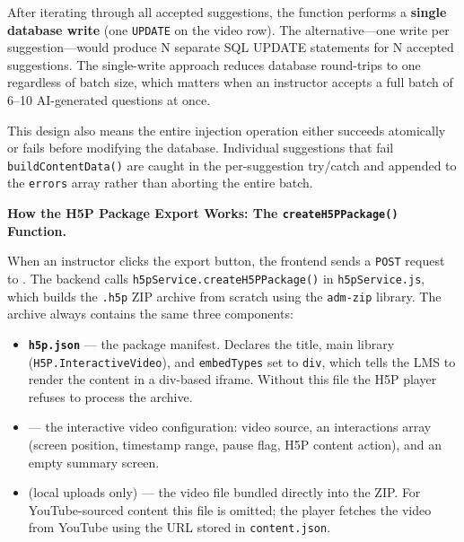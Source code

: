 After iterating through all accepted suggestions, the function performs a \textbf{single database write} (one \texttt{UPDATE} on the video row). The alternative---one write per suggestion---would produce N separate SQL UPDATE statements for N accepted suggestions. The single-write approach reduces database round-trips to one regardless of batch size, which matters when an instructor accepts a full batch of 6--10 AI-generated questions at once.

This design also means the entire injection operation either succeeds atomically or fails before modifying the database. Individual suggestions that fail \texttt{buildContentData()} are caught in the per-suggestion try/catch and appended to the \texttt{errors} array rather than aborting the entire batch.

\textbf{How the H5P Package Export Works: The \texttt{createH5PPackage()} Function.}

When an instructor clicks the export button, the frontend sends a \texttt{POST} request to . The backend calls \texttt{h5pService.createH5PPackage()} in \texttt{h5pService.js}, which builds the \texttt{.h5p} ZIP archive from scratch using the \texttt{adm-zip} library. The archive always contains the same three components:

\begin{itemize}
  \item \textbf{\texttt{h5p.json}} --- the package manifest. Declares the title, main library (\texttt{H5P.InteractiveVideo}), and \texttt{embedTypes} set to \texttt{div}, which tells the LMS to render the content in a div-based iframe. Without this file the H5P player refuses to process the archive.
  \item \textbf{} --- the interactive video configuration: video source, an interactions array (screen position, timestamp range, pause flag, H5P content action), and an empty summary screen.
  \item \textbf{} (local uploads only) --- the video file bundled directly into the ZIP. For YouTube-sourced content this file is omitted; the player fetches the video from YouTube using the URL stored in \texttt{content.json}.
\end{itemize}

